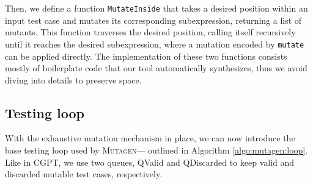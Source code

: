 \documentclass[sigconf,review,anonymous]{acmart}
\newcommand{\mutagen}{\textsc{Mutagen}\xspace}
\begin{document}
\noindent Then, we define a function \texttt{MutateInside} that takes a desired
position within an input test case and mutates its corresponding subexpression,
returning a list of mutants.
%
%
%
%
This function traverses the desired position, calling itself recursively until
it reaches the desired subexpression, where a mutation encoded by
\texttt{mutate} can be applied directly.
%
The implementation of these two functions consists mostly of boilerplate code
that our tool automatically synthesizes, thus we avoid diving into details to
preserve space.    


%


\subsection{Testing loop}

With the exhaustive mutation mechanism in place, we can now introduce the base
testing loop used by \mutagen --- outlined in Algorithm \ref{algo:mutagen:loop}.
%
Like in CGPT, we use two queues, QValid and QDiscarded to keep valid and
discarded mutable test cases, respectively.
%


\begin{algorithm}[t]
  \SetAlgoLined
  \DontPrintSemicolon
\caption{\label{algo:mutagen:loop}\mutagen Testing Loop}
\end{algorithm}
\end{document}
